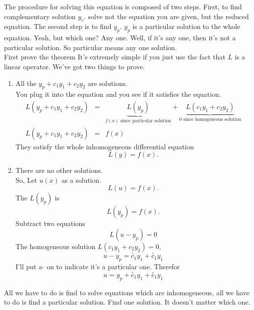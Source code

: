 The procedure for solving this equation is composed of two steps.
First, to find complementary solution $y_c$.
solve not the equation you are given, but the reduced equation.
The second step is to find $y_p$.
$y_p$ is a particular solution to the whole equation. Yeah, but which one?
Any one. Well, if it's any one, then it's not a particular solution.
So particular means any one solution.\\


First prove the theorem
It's extremely simple if you just use the fact that $L$ is a linear operator.
We've got two things to prove.
\begin{enumerate}
\item All the $y_p + c_1 y_1 + c_2 y_2$ are solutions.\\
  You plug it into the equation and you see if it satisfies the equation.
  \begin{eqnarray*}
    L(y_p + c_1 y_1 + c_2 y_2)
    &=& \underbrace{L(y_p)}_{f(x) \text{ since particular solution} }
        + \underbrace{L(c_1 y_1 + c_2 y_2)}_{0 \text{ since homogeneous solution}} \\
    L(y_p + c_1 y_1 + c_2 y_2) &=& f(x)    
  \end{eqnarray*}
  They satisfy the whole inhomogeneous differential equation
  \begin{equation*}
    L(y) = f(x).  
  \end{equation*}

\item There are no other solutions. \\
  So, Let $u(x)$ as a solution.
  \begin{equation*}
    L(u) = f(x).
  \end{equation*}
  The $L(y_p)$ is
  \begin{equation*}
    L(y_p) = f(x). 
  \end{equation*}
  Subtract two equations
  \begin{equation*}
    L(u - y_p) = 0 
  \end{equation*}
  The homogeneous solution $L(c_1 y_1 + c_2 y_2) = 0$, 
  \begin{equation*}
    u - y_p = \tilde{c_1}y_1 + \tilde{c_1} y_1 
  \end{equation*}
  I'll put a $\tilde{ }$ on to indicate it's a particular one. 
  Therefor
  \begin{equation*}
    u  = y_p + \tilde{c_1}y_1 + \tilde{c_1} y_1 
  \end{equation*}  
\end{enumerate}
All we have to do is find to solve equations which are inhomogeneous,
all we have to do is find a particular solution.
Find one solution. It doesn't matter which one.
\clearpage

